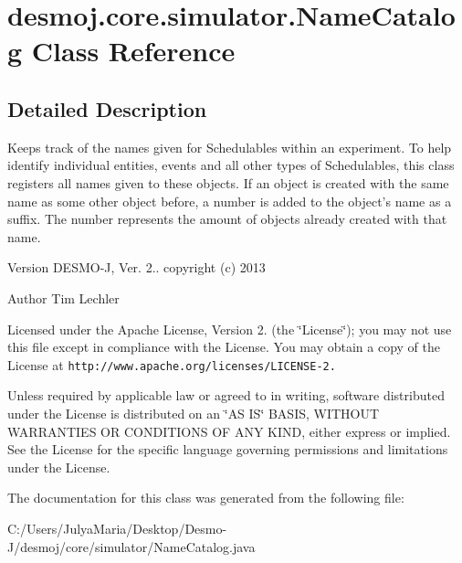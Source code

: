 \section{desmoj.\-core.\-simulator.\-Name\-Catalog Class Reference}
\label{classdesmoj_1_1core_1_1simulator_1_1_name_catalog}


\subsection{Detailed Description}
Keeps track of the names given for Schedulables within an experiment. To help identify individual entities, events and all other types of Schedulables, this class registers all names given to these objects. If an object is created with the same name as some other object before, a number is added to the object's name as a suffix. The number represents the amount of objects already created with that name.

\begin{DoxyVersion}{Version}
D\-E\-S\-M\-O-\/\-J, Ver. 2.. copyright (c) 2013 
\end{DoxyVersion}
\begin{DoxyAuthor}{Author}
Tim Lechler
\end{DoxyAuthor}
Licensed under the Apache License, Version 2. (the \char`\"{}\-License\char`\"{}); you may not use this file except in compliance with the License. You may obtain a copy of the License at {\tt http\-://www.\-apache.\-org/licenses/\-L\-I\-C\-E\-N\-S\-E-\/2.}

Unless required by applicable law or agreed to in writing, software distributed under the License is distributed on an \char`\"{}\-A\-S I\-S\char`\"{} B\-A\-S\-I\-S, W\-I\-T\-H\-O\-U\-T W\-A\-R\-R\-A\-N\-T\-I\-E\-S O\-R C\-O\-N\-D\-I\-T\-I\-O\-N\-S O\-F A\-N\-Y K\-I\-N\-D, either express or implied. See the License for the specific language governing permissions and limitations under the License. 

The documentation for this class was generated from the following file\-:\begin{DoxyCompactItemize}
\item 
C\-:/\-Users/\-Julya\-Maria/\-Desktop/\-Desmo-\/\-J/desmoj/core/simulator/Name\-Catalog.\-java\end{DoxyCompactItemize}
